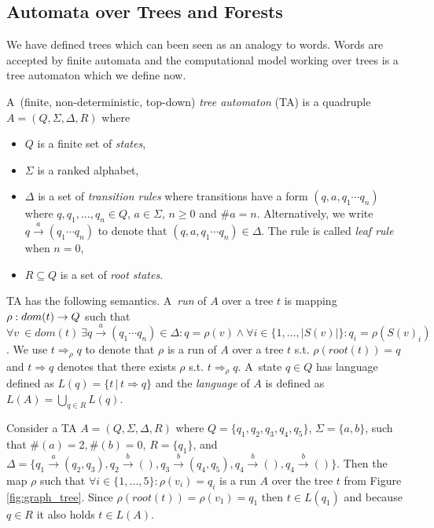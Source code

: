 \documentclass[a4paper, 12pt]{article}
\begin{document}
\subsection{Automata over Trees and Forests}
\label{subsec:ta}

We have defined trees which can been seen as an analogy to words.
Words are accepted by finite automata and the computational model
working over trees is a tree automaton which we define now.

A~(finite, non-deterministic, top-down) \emph{tree automaton} (TA) is a
quadruple $A = (Q, \Sigma, \Delta, R)$ where
\begin{itemize}
	\item $Q$ is a finite set of \emph{states},
	\item $\Sigma$ is a ranked alphabet,
	\item $\Delta$ is a set of \emph{transition rules} where transitions have a form $(q,a,q_1 \cdots q_n)$ where $q,q_1,\ldots,q_n \in Q$, $a \in \Sigma$, $n \geq 0$ and $\#a = n$.
		Alternatively, we write $q \xrightarrow{a} (q_1 \cdots q_n)$ to denote that $(q,a,q_1 \cdots q_n) \in \Delta$.
		The rule is called \emph{leaf rule} when $n=0$,
	\item $R \subseteq Q$ is a set of \emph{root states}.
\end{itemize}

TA has the following semantics.
A~\emph{run} of $A$ over a tree $t$ is mapping $\rho: dom(t) \rightarrow Q$ such that
$\forall v~\in dom(t)\ \exists q \xrightarrow{a} (q_1 \cdots q_n) \in \Delta:  q=\rho(v) \wedge  \forall i \in \{1, \ldots, |S(v)|\}: q_i=\rho(S(v)_i)$.
We use $t \Rightarrow_{\rho} q$ to denote that $\rho$ is a run of $A$
over a tree $t$ s.t. $\rho(root(t)) = q$ and $t \Rightarrow q$ denotes that
there exists $\rho$ s.t. $t \Rightarrow_{\rho} q$. %
A~state $q\in Q$ has language defined as $L(q) = \{t\,|\, t \Rightarrow q\}$
and the \emph{language} of $A$ is defined as $L(A) = \bigcup_{q\in R} L(q)$.

\bexmp
Consider a TA $A=(Q,\Sigma,\Delta, R)$
where $Q=\{q_1,q_2,q_3,q_4,q_5\}$, $\Sigma = \{a,b\}$,
such that $\#(a) = 2, \#(b) =0$, $R=\{q_1\}$,
and $\Delta=\{q_1 \xrightarrow{a} (q_2,q_3), q_2 \xrightarrow{b} (),
q_3 \xrightarrow{b} (q_4,q_5), q_4 \xrightarrow{b} (), q_4 \xrightarrow{b} ()\}$.
Then the map $\rho$ such that $\forall i \in \{1,\ldots,5\}: \rho(v_i) = q_i$
is a run $A$ over the tree $t$ from Figure \ref{fig:graph_tree}.
Since $\rho(root(t)) = \rho(v_1) = q_1$ then $t \in L(q_1)$ and because $q \in R$
it also holds $t \in L(A)$.
\label{ex:ta}
\eexmp
\end{document}
